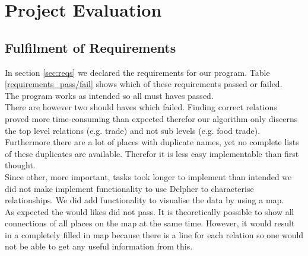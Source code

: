 \chapter{Project Evaluation}


\section{Fulfilment of Requirements}
In section \ref{sec:reqs} we declared the requirements for our program. Table \ref{requirements_pass/fail} shows which of these requirements passed or failed. \\
The program works as intended so all must haves passed. \\
There are however two should haves which failed. Finding correct relations proved more time-consuming than expected therefor our algorithm only discerns the top level relations (e.g. trade) and not sub levels (e.g. food trade). Furthermore there are a lot of places with duplicate names, yet no complete lists of these duplicates are available. Therefor it is less easy implementable than first thought. \\
Since other, more important, tasks took longer to implement than intended we did not make implement functionality to use Delpher to characterise relationships. We did add functionality to visualise the data by using a map. \\
As expected the would likes did not pass. It is theoretically possible to show all connections of all places on the map at the same time. However, it would result in a completely filled in map because there is a line for each relation so one would not be able to get any useful information from this.

